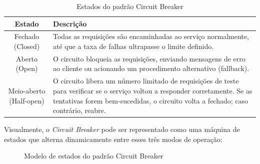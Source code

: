 \begin{table}[H]
\centering
\begin{tabular}{|c|p{10cm}|}
\hline
\textbf{Estado}      & \textbf{Descrição}                                                                                       \\ \hline
Fechado (Closed)     & Todas as requisições são encaminhadas ao serviço normalmente, até que a taxa de falhas ultrapasse o limite definido. \\ \hline
Aberto (Open)        & O circuito bloqueia as requisições, enviando mensagens de erro ao cliente ou acionando um procedimento alternativo (fallback). \\ \hline
Meio-aberto (Half-open) & O circuito libera um número limitado de requisições de teste para verificar se o serviço voltou a responder corretamente. Se as tentativas forem bem-sucedidas, o circuito volta a fechado; caso contrário, reabre. \\ \hline
\end{tabular}
\caption{Estados do padrão Circuit Breaker \citep{suprapto2021}}
\label{table:circuit_breaker_states}
\end{table}

Visualmente, o \textit{Circuit Breaker} pode ser representado como uma máquina de estados que alterna dinamicamente entre esses três modos de operação:

\begin{figure}[H]
\centering
\vspace{1.0cm}
\vspace{1.0cm}
\caption{Modelo de estados do padrão Circuit Breaker}
\label{fig:tikz-circuit-breaker}
\end{figure}

